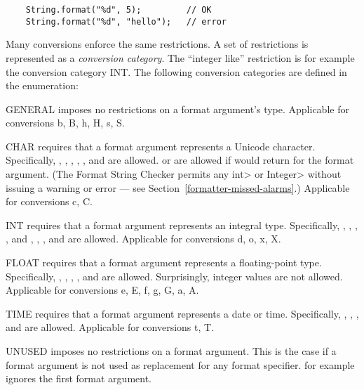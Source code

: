 \begin{Verbatim}
    String.format("%d", 5);         // OK
    String.format("%d", "hello");   // error
\end{Verbatim}

\noindent Many conversions enforce the same restrictions.  A set of
restrictions is represented as a \emph{conversion
category}. The ``integer like'' restriction is for example the conversion
category INT\@.  The following conversion categories are defined in the
 enumeration:

\begin{description}
\item{GENERAL} imposes no restrictions on a format argument's type. Applicable for
    conversions b, B, h, H, s, S.

\item{CHAR} requires that a format argument represents a Unicode character.
    Specifically, , , ,
    , , and  are allowed.
     or  are allowed if
     would return 
    for the format argument. (The Format String Checker permits any \<int>
    or \<Integer> without issuing a warning or error --- see
    Section~\ref{formatter-missed-alarms}.)
    Applicable for conversions c, C.

\item{INT} requires that a format argument represents an integral type. Specifically,
    , , , ,
     and , ,
    , and  are allowed. Applicable for
    conversions d, o, x, X.  

\item{FLOAT} requires that a format argument represents a floating-point type.  Specifically,
    , , ,
    , and  are allowed. Surprisingly, integer
    values are not allowed. Applicable for
    conversions e, E, f, g, G, a, A.
 
\item{TIME} requires that a format argument represents a date or time.
    Specifically, , , , and
     are allowed.  Applicable for conversions t, T.

\item{UNUSED} imposes no restrictions on a format argument. This is the case if a
    format argument is not used as replacement for any format specifier.
     for example ignores the first format argument. 
\end{description}

